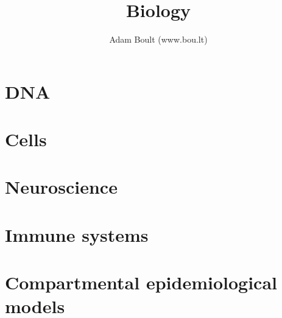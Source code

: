 \documentclass[oneside]{book}
\begin{document}
\author{Adam Boult (www.bou.lt)}
\title{Biology}
\maketitle

\setcounter{tocdepth}{1}
\tableofcontents



\part{DNA}



\part{Cells}





\part{Neuroscience}


\part{Immune systems}







\part{Compartmental epidemiological models}





\end{document}
